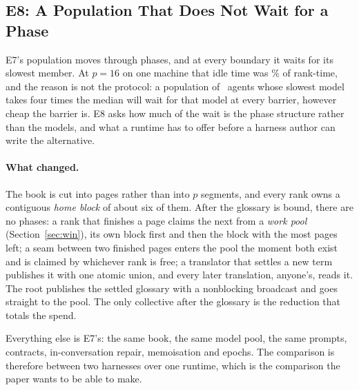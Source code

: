 
\subsection{E8: A Population That Does Not Wait for a Phase}
\label{sec:eval-e8}

E7's population moves through phases, and at every boundary it waits for its
slowest member. At $p=16$ on one machine that idle time was
\eSevenCoordShareSixteen\% of rank-time, and the reason is not the protocol: a
population of \eEightRanks\ agents whose slowest model takes four times the
median will wait for that model at every barrier, however cheap the barrier is.
E8 asks how much of the wait is the phase structure rather than the models, and
what a runtime has to offer before a harness author can write the alternative.

\paragraph{What changed.} The book is cut into pages rather than into $p$
segments, and every rank owns a contiguous \emph{home block} of about six of
them. After the glossary is bound, there are no phases: a rank that finishes a
page claims the next from a \emph{work pool} (Section~\ref{sec:win}), its own
block first and then the block with the most pages left; a seam between two
finished pages enters the pool the moment both exist and is claimed by whichever
rank is free; a translator that settles a new term publishes it with one atomic
union, and every later translation, anyone's, reads it. The root publishes the
settled glossary with a nonblocking broadcast and goes straight to the pool. The
only collective after the glossary is the reduction that totals the spend.

Everything else is E7's: the same book, the same model pool, the same prompts,
contracts, in-conversation repair, memoisation and epochs. The comparison is
therefore between two harnesses over one runtime, which is the comparison the
paper wants to be able to make.

